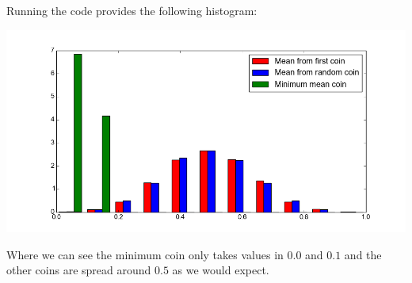 \documentclass[a4paper]{article}
\begin{document}
\subsection{}
Running the code provides the following histogram:
\begin{center}
	\includegraphics[scale=0.5]{hist1}
\end{center}
Where we can see the minimum coin only takes values in $0.0$ and $0.1$ and the other coins are spread around $0.5$ as we would expect.
\end{document}
